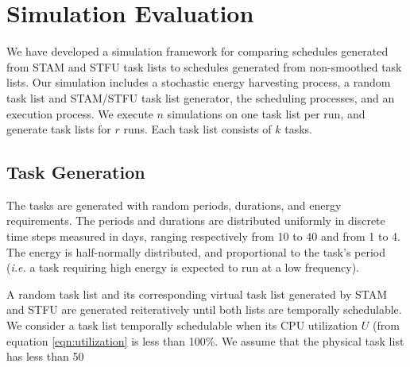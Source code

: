 \section{Simulation Evaluation} \label{sec:simulation}

We have developed a simulation framework for comparing schedules generated from \textsc{STAM} and \textsc{STFU} task lists to schedules generated from non-smoothed task lists.  Our simulation includes a stochastic energy harvesting process, a random task list and \textsc{STAM}/\textsc{STFU} task list generator, the scheduling processes, and an execution process.  We execute $n$ simulations on one task list per run, and generate task lists for $r$ runs.  Each task list consists of $k$ tasks.

\subsection{Task Generation}
The tasks are generated with random periods, durations, and energy requirements.  The periods and durations are distributed uniformly in discrete time steps measured in days, ranging respectively from 10 to 40 and from 1 to 4.  The energy is half-normally distributed, and proportional to the task's period (\emph{i.e.} a task requiring high energy is expected to run at a low frequency).

A random task list and its corresponding virtual task list generated by \textsc{STAM} and \textsc{STFU} are generated reiteratively until both lists are temporally schedulable.  We consider a task list temporally schedulable when its CPU utilization $U$ (from equation \ref{eqn:utilization} is less than 100\%.  We assume that the physical task list has less than 50%

